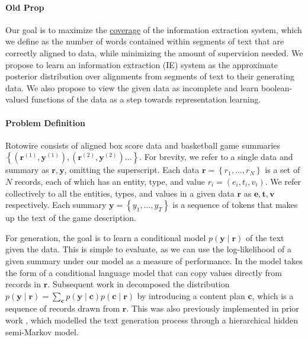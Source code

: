 \documentclass[11pt]{article}
\newcommand\set[1]{\left\{#1\right\}}
\newcommand{\bc}{\mathbf{c}}
\newcommand{\be}{\mathbf{e}}
\newcommand{\br}{\mathbf{r}}
\newcommand{\bt}{\mathbf{t}}
\newcommand{\bv}{\mathbf{v}}
\newcommand{\by}{\mathbf{y}}
\begin{document}
\paragraph{Old Prop}
Our goal is to maximize the \underline{coverage} of the information extraction system,
which we define as the number of words contained within segments of text that are correctly aligned to data,
while minimizing the amount of supervision needed.
We propose to learn an information extraction (IE) system as the approximate posterior distribution over 
alignments from segments of text to their generating data.
We also propose to view the given data as incomplete
and learn boolean-valued functions of the data as a step
towards representation learning.

\paragraph{Problem Definition}
\begin{comment}
\item Define notation
\item Define generation, mention sam and puduppully work.
\item Define extraction and its subtasks, mention regina and percy's work.
\item TODO: maybe combine align and values? Although I prefer to keep them separate
since values will probably turn into fill in the away team's values given home team's
\end{comment}
Rotowire consists of aligned box score data and basketball game summaries
$\set{(\br^{(1)}, \by^{(1)}),(\br^{(2)},\by^{(2)})\ldots}$.
For brevity, we refer to a single data and summary as $\br,\by$, omitting the superscript.
Each data $\br = \set{r_1,\ldots,r_N}$ is a set of $N$ records, each of which has
an entity, type, and value $r_i = (e_i, t_i, v_i)$.
We refer collectively to all the entities, types, and values in a given data $\br$ as
$\be,\bt,\bv$ respectively.
Each summary $\by = \set{y_1,\ldots,y_T}$ is a sequence of tokens that makes up the
text of the game description.

For generation, the goal is to learn a conditional model $p(\by\mid\br)$ of the text given the data.
This is simple to evaluate, as we can use the log-likelihood of a given summary under our model
as a measure of performance.
In \citet{wiseman2017d2t} the model takes the form of a conditional language model
that can copy values directly from records in $\br$.
Subsequent work in \citet{puduppully2018contentselection} decomposed the distribution 
$p(\by\mid\br) = \sum_{\bc}p(\by\mid\bc)p(\bc\mid\br)$
by introducing a content plan $\bc$, which is a sequence of records drawn from $\br$.
This was also previously implemented in prior work \citep{liang2009semalign},
which modelled the text generation process through a hierarchical hidden semi-Markov model.
\end{document}
